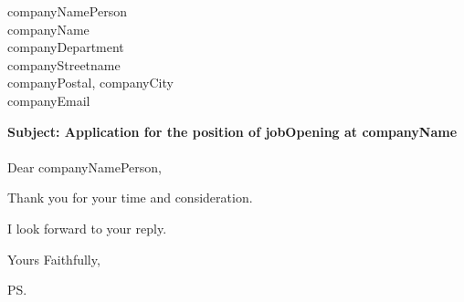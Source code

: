 \documentclass{letter}
\newcommand{\letterdate}{1/1/2021}
\newcommand{\jobopening}{jobOpening}
\newcommand{\companynameperson}{companyNamePerson}
\newcommand{\companyname}{companyName}
\newcommand{\companydepartment}{companyDepartment}
\newcommand{\companystreet}{companyStreetname}
\newcommand{\companypostal}{companyPostal}
\newcommand{\companycity}{companyCity}
\newcommand{\companyemail}{companyEmail}
\begin{document}
\begin{letter}{\companynameperson \\ \companyname \\ \companydepartment \\ \companystreet \\ \companypostal, \companycity \\ \companyemail}


	\opening{
		{\bf Subject: Application for the position of {\jobopening} at \companyname} \\ ~ \\
	          Dear \companynameperson,
	}

	

	Thank you for your time and consideration.

	I look forward to your reply.

	\closing{Yours Faithfully,}

	\ps


\end{letter}
\end{document}
